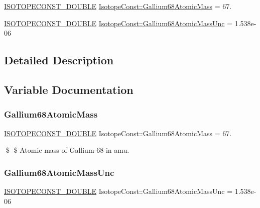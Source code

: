 \begin{DoxyCompactItemize}
\item 
\mbox{\hyperlink{group___isotope_const-_macros_ga8f45a7272ce02c0b4c65c44636ed719a}{I\+S\+O\+T\+O\+P\+E\+C\+O\+N\+S\+T\+\_\+\+D\+O\+U\+B\+LE}} \mbox{\hyperlink{group___isotope_const-_gallium-_ga68_ga2a775ce025f6d81849900b5fbc688bfb}{Isotope\+Const\+::\+Gallium68\+Atomic\+Mass}} = 67.
\item 
\mbox{\hyperlink{group___isotope_const-_macros_ga8f45a7272ce02c0b4c65c44636ed719a}{I\+S\+O\+T\+O\+P\+E\+C\+O\+N\+S\+T\+\_\+\+D\+O\+U\+B\+LE}} \mbox{\hyperlink{group___isotope_const-_gallium-_ga68_gac1166757f3d05c3f85a1e7838d85b7bd}{Isotope\+Const\+::\+Gallium68\+Atomic\+Mass\+Unc}} = 1.\+538e-\/06
\end{DoxyCompactItemize}


\subsection{Detailed Description}


\subsection{Variable Documentation}
\mbox{\label{group___isotope_const-_gallium-_ga68_ga2a775ce025f6d81849900b5fbc688bfb}} 
\subsubsection{\texorpdfstring{Gallium68\+Atomic\+Mass}{Gallium68AtomicMass}}
{\footnotesize\ttfamily \mbox{\hyperlink{group___isotope_const-_macros_ga8f45a7272ce02c0b4c65c44636ed719a}{I\+S\+O\+T\+O\+P\+E\+C\+O\+N\+S\+T\+\_\+\+D\+O\+U\+B\+LE}} Isotope\+Const\+::\+Gallium68\+Atomic\+Mass = 67.}

\$ \$ Atomic mass of Gallium-\/68 in amu. \mbox{\label{group___isotope_const-_gallium-_ga68_gac1166757f3d05c3f85a1e7838d85b7bd}} 
\subsubsection{\texorpdfstring{Gallium68\+Atomic\+Mass\+Unc}{Gallium68AtomicMassUnc}}
{\footnotesize\ttfamily \mbox{\hyperlink{group___isotope_const-_macros_ga8f45a7272ce02c0b4c65c44636ed719a}{I\+S\+O\+T\+O\+P\+E\+C\+O\+N\+S\+T\+\_\+\+D\+O\+U\+B\+LE}} Isotope\+Const\+::\+Gallium68\+Atomic\+Mass\+Unc = 1.\+538e-\/06}

